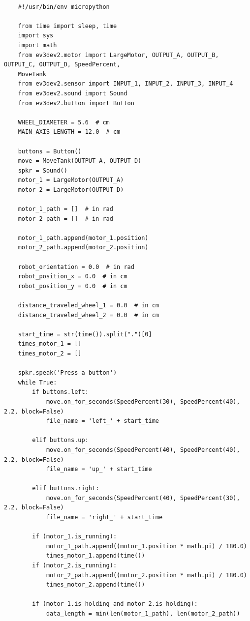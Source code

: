     {
   \begin{verbatim} 
    
    #!/usr/bin/env micropython

    from time import sleep, time
    import sys
    import math
    from ev3dev2.motor import LargeMotor, OUTPUT_A, OUTPUT_B, OUTPUT_C, OUTPUT_D, SpeedPercent,
    MoveTank
    from ev3dev2.sensor import INPUT_1, INPUT_2, INPUT_3, INPUT_4
    from ev3dev2.sound import Sound
    from ev3dev2.button import Button
    
    WHEEL_DIAMETER = 5.6  # cm
    MAIN_AXIS_LENGTH = 12.0  # cm
    
    buttons = Button()
    move = MoveTank(OUTPUT_A, OUTPUT_D)
    spkr = Sound()
    motor_1 = LargeMotor(OUTPUT_A)
    motor_2 = LargeMotor(OUTPUT_D)
    
    motor_1_path = []  # in rad
    motor_2_path = []  # in rad
    
    motor_1_path.append(motor_1.position)
    motor_2_path.append(motor_2.position)
    
    robot_orientation = 0.0  # in rad
    robot_position_x = 0.0  # in cm
    robot_position_y = 0.0  # in cm
    
    distance_traveled_wheel_1 = 0.0  # in cm
    distance_traveled_wheel_2 = 0.0  # in cm
    
    start_time = str(time()).split(".")[0]
    times_motor_1 = []
    times_motor_2 = []
    
    spkr.speak('Press a button')
    while True:
        if buttons.left:
            move.on_for_seconds(SpeedPercent(30), SpeedPercent(40), 2.2, block=False)
            file_name = 'left_' + start_time
    
        elif buttons.up:
            move.on_for_seconds(SpeedPercent(40), SpeedPercent(40), 2.2, block=False)
            file_name = 'up_' + start_time
    
        elif buttons.right:
            move.on_for_seconds(SpeedPercent(40), SpeedPercent(30), 2.2, block=False)
            file_name = 'right_' + start_time
    
        if (motor_1.is_running):
            motor_1_path.append((motor_1.position * math.pi) / 180.0)
            times_motor_1.append(time())
        if (motor_2.is_running):
            motor_2_path.append((motor_2.position * math.pi) / 180.0)
            times_motor_2.append(time())
    
        if (motor_1.is_holding and motor_2.is_holding):
            data_length = min(len(motor_1_path), len(motor_2_path))
    

\end{verbatim}}
